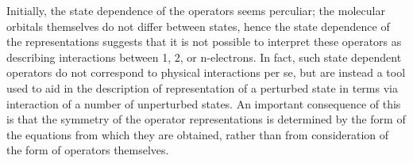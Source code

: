 \documentclass[12pt]{article}
\begin{document}
\noindent Initially, the state dependence of the operators seems perculiar; the
molecular orbitals themselves do not differ between states, hence the state
dependence of the representations suggests that it is not possible to interpret
these operators as describing interactions between 1, 2, or n-electrons.  In
fact, such state dependent operators do not correspond to physical interactions
per se, but are instead a tool used to aid in the description of representation
of a perturbed state in terms via interaction of a number of unperturbed states.
An important consequence of this is that the symmetry of the operator
representations is determined by the form of the equations from which they are
obtained, rather than from consideration of the form of operators themselves.
\end{document}
